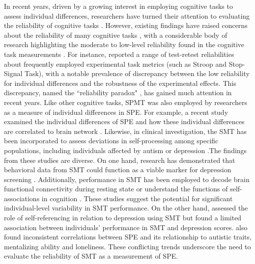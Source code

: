\documentclass[sn-apa]{sn-jnl}%
\theoremstyle{thmstyleone}%
\theoremstyle{thmstyletwo}%
\theoremstyle{thmstylethree}%
\begin{document}
In recent years, driven by a growing interest in employing cognitive tasks to assess individual differences, researchers have turned their attention to evaluating the reliability of cognitive tasks \parencite[e.g.,][]{hedge2018reliability,kucina2023calibration}. However, existing findings have raised concerns about the reliability of many cognitive tasks \parencite{rouder2019psychometrics, karvelis2023individual}, with a  considerable body of research highlighting the moderate to low-level reliability found in the cognitive task measurements \parencite{clark2022test,green2016use,enkavi2019large}. For instance, \textcite{hedge2018reliability} reported a range of test-retest reliabilities about frequently employed experimental task metrics (such as Stroop and Stop-Signal Task), with a notable prevalence of discrepancy between the low reliability for individual differences and the robustness of the experimental effects. This discrepancy, named the ``reliability paradox" \parencite{logie1996group}, has gained much attention in recent years. Like other cognitive tasks, SPMT was also employed by researchers as a measure of individual differences in SPE. For example, a recent study examined the individual differences of SPE and how these individual differences are correlated to brain network \parencite{zhang2023decoding}. Likewise, in clinical investigation, the SMT has been incorporated to assess deviations in self-processing among specific populations, including individuals affected by autism or depression \parencite[e.g.,][]{hobbs2023self, liu2022depression,moseley2022levels}.The findings from these studies are diverse. On one hand, research has demonstrated that behavioral data from SMT could function as a viable marker for depression screening \parencite{liu2022depression}. Additionally, performance in SMT has been employed to decode brain functional connectivity during resting state \parencite{zhang2023decoding} or understand the functions of self-associations in cognition \parencite{scheller2022power,scheller2022social,yankouskaya2023relationship}. These studies suggest the potential for significant individual-level variability in SMT performance. On the other hand, \textcite{hobbs2023self} assessed the role of self-referencing in relation to depression using SMT but found a limited association between individuals' performance in SMT and depression scores. \textcite{moseley2022levels} also found inconsistent correlations between SPE and its relationship to autistic traits, mentalizing ability and loneliness. These conflicting trends underscore the need to evaluate the reliability of SMT as a measurement of SPE.
\end{document}
